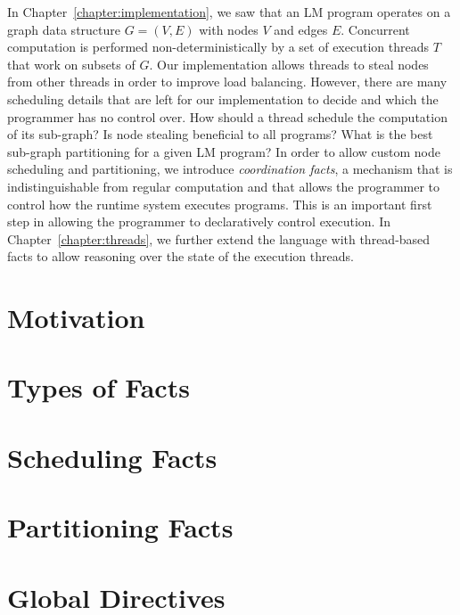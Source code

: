 In Chapter~\ref{chapter:implementation}, we saw that an LM program operates on a graph data structure $G = (V, E)$ with nodes $V$ and edges $E$. Concurrent computation is performed non-deterministically by a set of execution threads $T$ that work on subsets of $G$.
Our implementation allows threads
to steal nodes from other threads in order to improve load balancing.  However,
there are many scheduling details that are left for our implementation to decide and which the programmer has no control over. How should a thread
schedule the computation of its sub-graph? Is node stealing beneficial to all
programs? What is the best sub-graph partitioning for a given LM program?  In order to allow custom node scheduling and partitioning, we introduce \emph{coordination facts}, a
mechanism that is indistinguishable from regular computation and that allows the
programmer to control how the runtime system executes programs. This is
an important first step in allowing the programmer to declaratively control execution. In Chapter~\ref{chapter:threads}, we further extend the language with thread-based facts to allow reasoning over the state of the execution threads.

\section{Motivation}\label{section:coord:rationale}



\section{Types of Facts}



\section{Scheduling Facts}\label{sec:coord:fifo}



\section{Partitioning Facts}


\section{Global Directives}\label{sec:coordination:global}

